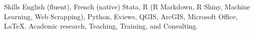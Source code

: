 
\begin{rubric}{\small Skills}
\entry*[Languages]
	 English (fluent), French (native)
\entry*[Softwares]
	Stata, R (R Markdown, R Shiny, Machine Learning, Web Scrapping), Python, Eviews, QGIS, ArcGIS, Microsoft Office, \LaTeX.
\entry*[Misc.]
	Academic research, Teaching, Training, and Consulting.
\end{rubric}
